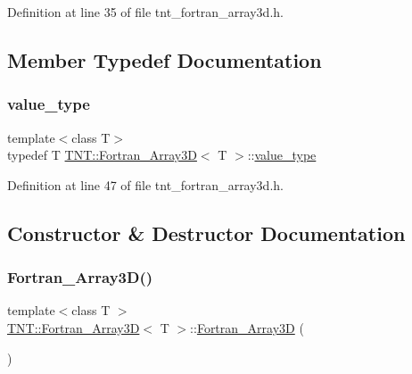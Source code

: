 Definition at line 35 of file tnt\+\_\+fortran\+\_\+array3d.\+h.



\subsection{Member Typedef Documentation}
\mbox{\label{classTNT_1_1Fortran__Array3D_ac63354327521c0974bb45a9b02a9ff40}} 
\subsubsection{\texorpdfstring{value\+\_\+type}{value\_type}}
{\footnotesize\ttfamily template$<$class T$>$ \\
typedef T \hyperlink{classTNT_1_1Fortran__Array3D}{T\+N\+T\+::\+Fortran\+\_\+\+Array3D}$<$ T $>$\+::\hyperlink{classTNT_1_1Fortran__Array3D_ac63354327521c0974bb45a9b02a9ff40}{value\+\_\+type}}



Definition at line 47 of file tnt\+\_\+fortran\+\_\+array3d.\+h.



\subsection{Constructor \& Destructor Documentation}
\mbox{\label{classTNT_1_1Fortran__Array3D_a21a80db962738ae9b44f900a67a12d9d}} 
\subsubsection{\texorpdfstring{Fortran\+\_\+\+Array3\+D()}{Fortran\_Array3D()}\hspace{0.1cm}{\footnotesize\ttfamily [1/5]}}
{\footnotesize\ttfamily template$<$class T $>$ \\
\hyperlink{classTNT_1_1Fortran__Array3D}{T\+N\+T\+::\+Fortran\+\_\+\+Array3D}$<$ T $>$\+::\hyperlink{classTNT_1_1Fortran__Array3D}{Fortran\+\_\+\+Array3D} (\begin{DoxyParamCaption}{ }\end{DoxyParamCaption})}



